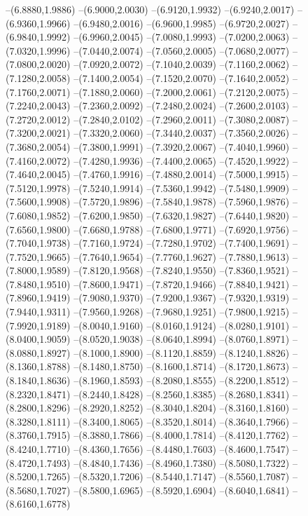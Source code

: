 {\begin{scope}
--(6.8880,1.9886)
--(6.9000,2.0030)
--(6.9120,1.9932)
--(6.9240,2.0017)
--(6.9360,1.9966)
--(6.9480,2.0016)
--(6.9600,1.9985)
--(6.9720,2.0027)
--(6.9840,1.9992)
--(6.9960,2.0045)
--(7.0080,1.9993)
--(7.0200,2.0063)
--(7.0320,1.9996)
--(7.0440,2.0074)
--(7.0560,2.0005)
--(7.0680,2.0077)
--(7.0800,2.0020)
--(7.0920,2.0072)
--(7.1040,2.0039)
--(7.1160,2.0062)
--(7.1280,2.0058)
--(7.1400,2.0054)
--(7.1520,2.0070)
--(7.1640,2.0052)
--(7.1760,2.0071)
--(7.1880,2.0060)
--(7.2000,2.0061)
--(7.2120,2.0075)
--(7.2240,2.0043)
--(7.2360,2.0092)
--(7.2480,2.0024)
--(7.2600,2.0103)
--(7.2720,2.0012)
--(7.2840,2.0102)
--(7.2960,2.0011)
--(7.3080,2.0087)
--(7.3200,2.0021)
--(7.3320,2.0060)
--(7.3440,2.0037)
--(7.3560,2.0026)
--(7.3680,2.0054)
--(7.3800,1.9991)
--(7.3920,2.0067)
--(7.4040,1.9960)
--(7.4160,2.0072)
--(7.4280,1.9936)
--(7.4400,2.0065)
--(7.4520,1.9922)
--(7.4640,2.0045)
--(7.4760,1.9916)
--(7.4880,2.0014)
--(7.5000,1.9915)
--(7.5120,1.9978)
--(7.5240,1.9914)
--(7.5360,1.9942)
--(7.5480,1.9909)
--(7.5600,1.9908)
--(7.5720,1.9896)
--(7.5840,1.9878)
--(7.5960,1.9876)
--(7.6080,1.9852)
--(7.6200,1.9850)
--(7.6320,1.9827)
--(7.6440,1.9820)
--(7.6560,1.9800)
--(7.6680,1.9788)
--(7.6800,1.9771)
--(7.6920,1.9756)
--(7.7040,1.9738)
--(7.7160,1.9724)
--(7.7280,1.9702)
--(7.7400,1.9691)
--(7.7520,1.9665)
--(7.7640,1.9654)
--(7.7760,1.9627)
--(7.7880,1.9613)
--(7.8000,1.9589)
--(7.8120,1.9568)
--(7.8240,1.9550)
--(7.8360,1.9521)
--(7.8480,1.9510)
--(7.8600,1.9471)
--(7.8720,1.9466)
--(7.8840,1.9421)
--(7.8960,1.9419)
--(7.9080,1.9370)
--(7.9200,1.9367)
--(7.9320,1.9319)
--(7.9440,1.9311)
--(7.9560,1.9268)
--(7.9680,1.9251)
--(7.9800,1.9215)
--(7.9920,1.9189)
--(8.0040,1.9160)
--(8.0160,1.9124)
--(8.0280,1.9101)
--(8.0400,1.9059)
--(8.0520,1.9038)
--(8.0640,1.8994)
--(8.0760,1.8971)
--(8.0880,1.8927)
--(8.1000,1.8900)
--(8.1120,1.8859)
--(8.1240,1.8826)
--(8.1360,1.8788)
--(8.1480,1.8750)
--(8.1600,1.8714)
--(8.1720,1.8673)
--(8.1840,1.8636)
--(8.1960,1.8593)
--(8.2080,1.8555)
--(8.2200,1.8512)
--(8.2320,1.8471)
--(8.2440,1.8428)
--(8.2560,1.8385)
--(8.2680,1.8341)
--(8.2800,1.8296)
--(8.2920,1.8252)
--(8.3040,1.8204)
--(8.3160,1.8160)
--(8.3280,1.8111)
--(8.3400,1.8065)
--(8.3520,1.8014)
--(8.3640,1.7966)
--(8.3760,1.7915)
--(8.3880,1.7866)
--(8.4000,1.7814)
--(8.4120,1.7762)
--(8.4240,1.7710)
--(8.4360,1.7656)
--(8.4480,1.7603)
--(8.4600,1.7547)
--(8.4720,1.7493)
--(8.4840,1.7436)
--(8.4960,1.7380)
--(8.5080,1.7322)
--(8.5200,1.7265)
--(8.5320,1.7206)
--(8.5440,1.7147)
--(8.5560,1.7087)
--(8.5680,1.7027)
--(8.5800,1.6965)
--(8.5920,1.6904)
--(8.6040,1.6841)
--(8.6160,1.6778)

\end{scope}}
